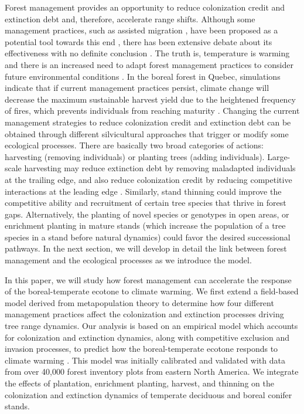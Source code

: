 Forest management provides an opportunity to reduce colonization credit
and extinction debt and, therefore, accelerate range shifts. Although
some management practices, such as assisted migration
\citep{Peters1985a}, have been proposed as a potential tool towards this
end \citep[\emph{e.g.}][]{Gray2011}, there has been extensive debate
about its effectiveness with no definite conclusion
\citep[\emph{e.g.}][]{McLachlan2007, Vila2010, Ricciardi2009, Schwartz2009}.
The truth is, temperature is warming and there is an increased need to
adapt forest management practices to consider future environmental
conditions \citep{Keenan2015, Ameztegui2018}. In the boreal forest in
Quebec, simulations indicate that if current management practices
persist, climate change will decrease the maximum sustainable harvest
yield due to the heightened frequency of fires, which prevents
individuals from reaching maturity \citep{BureauduForestierenChef2020}.
Changing the current management strategies to reduce colonization credit
and extinction debt can be obtained through different silvicultural
approaches that trigger or modify some ecological processes. There are
basically two broad categories of actions: harvesting (removing
individuals) or planting trees (adding individuals). Large-scale
harvesting may reduce extinction debt by removing maladapted individuals
at the trailing edge, and also reduce colonization credit by reducing
competitive interactions at the leading edge
\citep{Leithead2010, Steenberg2013, Brice2020}. Similarly, stand
thinning could improve the competitive ability and recruitment of
certain tree species that thrive in forest gaps. Alternatively, the
planting of novel species or genotypes in open areas, or enrichment
planting in mature stands (which increase the population of a tree
species in a stand before natural dynamics) could favor the desired
successional pathways. In the next section, we will develop in detail
the link between forest management and the ecological processes as we
introduce the model.

In this paper, we will study how forest management can accelerate the
response of the boreal-temperate ecotone to climate warming. We first
extend a field-based model derived from metapopulation theory to
determine how four different management practices affect the
colonization and extinction processes driving tree range dynamics. Our
analysis is based on an empirical model which accounts for colonization
and extinction dynamics, along with competitive exclusion and invasion
processes, to predict how the boreal-temperate ecotone responds to
climate warming \citep{Vissault2020}. This model was initially
calibrated and validated with data from over 40,000 forest inventory
plots from eastern North America. We integrate the effects of
plantation, enrichment planting, harvest, and thinning on the
colonization and extinction dynamics of temperate deciduous and boreal
conifer stands.


